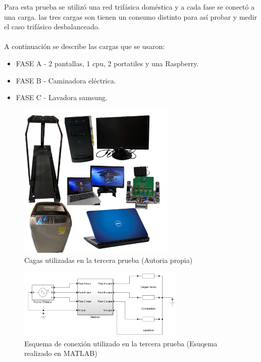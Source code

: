   Para esta prueba se utilizó una red trifásica doméstica y a cada fase se conectó a una carga. las tres cargas son tienen un consumo distinto para así probar y medir el caso trifásico desbalanceado.\\\\
  A continuación se describe las cargas que se usaron:\\
  \begin{itemize}
    \itemsep0em
    \item FASE A - 2 pantallas, 1 cpu, 2 portatiles y una Raspberry.
    \item FASE B - Caminadora eléctrica.
    \item FASE C - Lavadora samsung.
  \end{itemize}
    \begin{figure}[H]
      \begin{center}
          \includegraphics[width = 7.5cm]{4Resultados/prueba2.png}
          \caption{ Cagas utilizadas en la tercera prueba (Autoria propia)} 
          \label{fig:cargas-3}
     \end{center}
    \end{figure}
    \begin{figure}[H]
      \begin{center}
          \includegraphics[width = 8cm]{4Resultados/conexion3.jpeg}
          \caption{ Esquema de conexión utilizado en la tercera prueba (Esuqema realizado en MATLAB)} 
          \label{fig:conexion3}
     \end{center}
    \end{figure}
